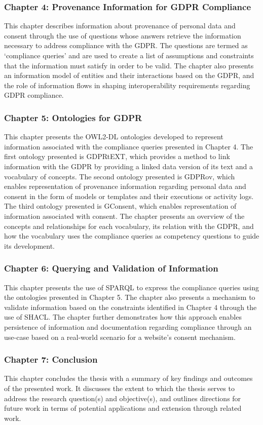 \subsubsection{Chapter 4: Provenance Information for GDPR Compliance}
This chapter describes information about provenance of personal data and consent through the use of questions whose answers retrieve the information necessary to address compliance with the GDPR. The questions are termed as `compliance queries' and are used to create a list of assumptions and constraints that the information must satisfy in order to be valid. The chapter also presents  an information model of entities and their interactions based on the GDPR, and the role of information flows in shaping interoperability requirements regarding GDPR compliance.

\subsubsection{Chapter 5: Ontologies for GDPR}
This chapter presents the OWL2-DL ontologies developed to represent information associated with the compliance queries presented in Chapter 4. The first ontology presented is GDPRtEXT, which provides a method to link information with the GDPR by providing a linked data version of its text and a vocabulary of concepts. The second ontology presented is GDPRov, which enables representation of provenance information regarding personal data and consent in the form of models or templates and their executions or activity logs. The third ontology presented is GConsent, which enables representation of information associated with consent. The chapter presents an overview of the concepts and relationships for each vocabulary, its relation with the GDPR, and how the vocabulary uses the compliance queries as competency questions to guide its development.

\subsubsection{Chapter 6: Querying and Validation of Information}
This chapter presents the use of SPARQL to express the compliance queries using the ontologies presented in Chapter 5. The chapter also presents a mechanism to validate information based on the constraints identified in Chapter 4 through the use of SHACL. The chapter further demonstrates how this approach enables persistence of information and documentation regarding compliance through an use-case based on a real-world scenario for a website's consent mechanism.

\subsubsection{Chapter 7: Conclusion}
This chapter concludes the thesis with a summary of key findings and outcomes of the presented work. It discusses the extent to which the thesis serves to address the research question(s) and objective(s), and outlines directions for future work in terms of potential applications and extension through related work.
